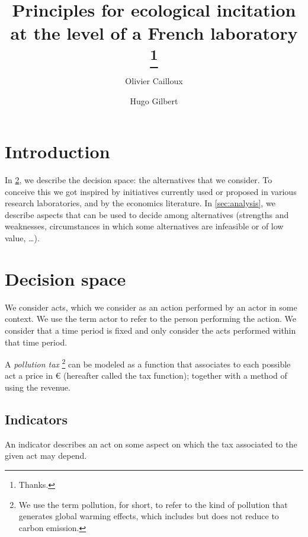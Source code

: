 \documentclass[version=3.21, pagesize, twoside=off, bibliography=totoc, DIV=calc, fontsize=12pt, a4paper, french, english]{scrartcl}
\title{Principles for ecological incitation at the level of a French laboratory \thanks{Thanks.}}
\author{Olivier Cailloux}
\author{Hugo Gilbert}
\affil{Université Paris-Dauphine, PSL Research University, CNRS, LAMSADE, 75016 PARIS, FRANCE\\
	\href{mailto:olivier.cailloux@dauphine.fr}{olivier.cailloux@dauphine.fr}
}
\begin{document}
\maketitle

\section{Introduction}
\label{sec:intro}
In \cref{sec:alts}, we describe the decision space: the alternatives that we consider. To conceive this we got inspired by initiatives currently used or proposed in various research laboratories, and by the economics literature. In \cref{sec:analysis}, we describe aspects that can be used to decide among alternatives (strengths and weaknesses, circumstances in which some alternatives are infeasible or of low value, …).

\section{Decision space}
\label{sec:alts}
We consider acts, which we consider as an action performed by an actor in some context. We use the term actor to refer to the person performing the action. We consider that a time period is fixed and only consider the acts performed within that time period.

A \emph{pollution tax} 
\footnote{We use the term pollution, for short, to refer to the kind of pollution that generates global warming effects, which includes but does not reduce to carbon emission.} 
can be modeled as a function that associates to each possible act a price in € (hereafter called the tax function); together with a method of using the revenue.

\subsection{Indicators}
An indicator describes an act on some aspect on which the tax associated to the given act may depend.
\end{document}

